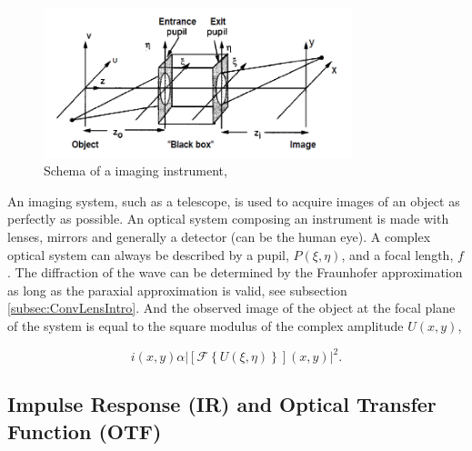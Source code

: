 \begin{figure}
\begin{center}
\includegraphics[width=0.8\textwidth,angle=0]{Figures/ImagingInstrumentGenSchema}
\decoRule
\caption{Schema of a imaging instrument, \citep[Chapter 6.1]{goodman_1968}}
\label{fig:ImagingInstrumentGenSchema}
\end{center}
\end{figure}

An imaging system, such as a telescope, is used to acquire images of an object as perfectly as possible. An optical system composing an instrument is made with lenses, mirrors and generally a detector (can be the human eye). A complex optical system can always be described by a pupil, $P(\xi,\eta)$, and a focal length, $f$. The diffraction of the wave can be determined by the Fraunhofer approximation as long as the paraxial approximation is valid, see subsection \ref{subsec:ConvLensIntro}. And the observed image of the object at the focal plane of the system is equal to the square modulus of the complex amplitude $U(x,y)$,

\begin{equation}
i(x,y) \alpha |\left[\mathcal{F}\left\lbrace U(\xi,\eta) \right\rbrace\right](x,y)|^2.
\label{eqt:i_modu_FT}
\end{equation}

\subsection{Impulse Response (IR) and Optical Transfer Function (OTF)}
\label{subsec:PSF_IR}

